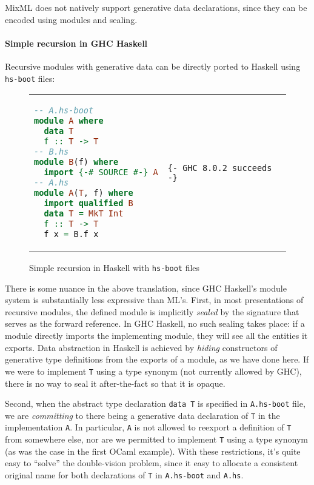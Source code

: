 \noindent
MixML does not natively support generative data declarations, since they can be
encoded using modules and sealing.

\paragraph{Simple recursion in GHC Haskell} Recursive modules
with generative data can be directly ported to Haskell using \verb|hs-boot| files:

\begin{figure}[H]
\begin{tabular}{p{} p{}}
\begin{lstlisting}[language=Haskell,escapechar=@]
-- A.hs-boot
module A where
  data T
  f :: T -> T
-- B.hs
module B(f) where
  import {-# SOURCE #-} A
-- A.hs
module A(T, f) where
  import qualified B
  data T = MkT Int
  f :: T -> T
  f x = B.f x
\end{lstlisting}
&
\begin{verbatim}
{- GHC 8.0.2 succeeds -}
\end{verbatim}
\end{tabular}
\caption{Simple recursion in Haskell with \texttt{hs-boot} files}
\label{fig:double-vision-simple-recursion-haskell-hs-boot}
\end{figure}

\noindent
There is some nuance in the above translation, since GHC Haskell's module
system is substantially less expressive than ML's.  First, in most
presentations of recursive modules, the defined module is implicitly
\emph{sealed} by the signature that serves as the forward reference.
In GHC Haskell, no such sealing takes place: if a module directly
imports the implementing module, they will see all the entities it
exports.  Data abstraction in Haskell is achieved by \emph{hiding}
constructors of generative type definitions from the exports of a module, as we
have done here. If we were to implement \verb|T| using a type synonym
(not currently allowed by GHC), there is no way to seal it after-the-fact
so that it is opaque.

Second, when the abstract type declaration \verb|data T| is specified in
\verb|A.hs-boot| file, we are \emph{committing} to there being a
generative data declaration of \verb|T| in the implementation \verb|A|.
In particular, \verb|A| is not allowed to reexport a definition of
\verb|T| from somewhere else, nor are we permitted to implement \verb|T|
using a type synonym (as was the case in the first OCaml example).
With these restrictions, it's quite easy to ``solve'' the double-vision
problem, since it easy to allocate a consistent original name for both
declarations of \verb|T| in \verb|A.hs-boot| and \verb|A.hs|.

